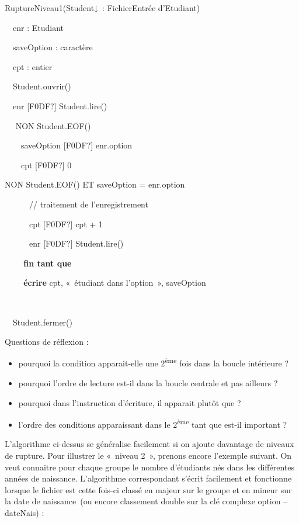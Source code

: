 {\sffamily
{} RuptureNiveau1(Student↓~: FichierEntrée
d’Etudiant)}

{\sffamily
{}}

{\sffamily
\ \ enr : Etudiant}

{\sffamily
\ \ saveOption : caractère}

{\sffamily
\ \ cpt : entier}

{\sffamily
\ \ Student.ouvrir()}

{\sffamily
\ \ enr \textrm{[F0DF?]} Student.lire()}

{\sffamily
\ \   NON Student.EOF()
\ \ }

{\sffamily
\ \ \ \ saveOption \textrm{[F0DF?]} enr.option\ \ \ \ }

{\sffamily
\ \ \ \ cpt \textrm{[F0DF?]} 0}

{\sffamily
{}  NON Student.EOF() ET
saveOption = enr.option \ \ }

{\sffamily
\ \ \ \ \ \ // traitement de l’enregistrement}

{\sffamily
\ \ \ \ \ \ cpt \textrm{[F0DF?]} cpt + 1}

{\sffamily
\ \ \ \ \ \ enr \textrm{[F0DF?]} Student.lire()}

{\sffamily\bfseries
\ \ \ \ fin tant que}

{\sffamily
\textbf{\ \ \ \ écrire} cpt, «~étudiant dans l’option~», saveOption}

{\sffamily
\ \    }

{\sffamily
\ \ Student.fermer()}

{\sffamily
{} }

{
Questions de réflexion : }

\liststyleListv
\begin{itemize}
\item {
pourquoi la condition 
apparait-elle une 2\textsuperscript{ème} fois dans la boucle intérieure
?}
\item {
pourquoi l’ordre de lecture est-il dans la boucle centrale et pas
ailleurs ?}
\item {
pourquoi dans l’instruction d’écriture, il apparait
 plutôt que
 ?}
\item {
l’ordre des conditions apparaissant dans le 2\textsuperscript{ème} tant
que est-il important ?}
\end{itemize}
{
L’algorithme ci-dessus se généralise facilement si on ajoute davantage
de niveaux de rupture. Pour illustrer le «~niveau 2~», prenons encore
l’exemple suivant. On veut connaitre pour chaque groupe le nombre
d’étudiants nés dans les différentes années de naissance. L’algorithme
correspondant s’écrit facilement et fonctionne lorsque le fichier est
cette fois-ci classé en majeur sur le groupe et en mineur sur la date
de naissance~(ou encore classement double sur la clé complexe option –
dateNais) :}

